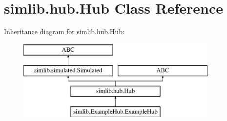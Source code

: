 \hypertarget{classsimlib_1_1hub_1_1_hub}{}\section{simlib.\+hub.\+Hub Class Reference}
\label{classsimlib_1_1hub_1_1_hub}
Inheritance diagram for simlib.\+hub.\+Hub\+:\begin{figure}[H]
\begin{center}
\leavevmode
\includegraphics[height=4.000000cm]{classsimlib_1_1hub_1_1_hub}
\end{center}
\end{figure}
